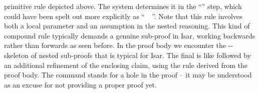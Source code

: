 \begin{isabellebody}
\begin{isamarkuptext}
  primitive rule depicted above.  The system determines it in the
  ``\hyperlink{command.proof}{\mbox{}}'' step, which could have been spelt out more
  explicitly as ``\hyperlink{command.proof}{\mbox{}}~\isa{{\isachardoublequote}{\isacharparenleft}{\isachardoublequote}}\hyperlink{method.rule}{\mbox{}}~\hyperlink{fact.InterI}{\mbox{}}\isa{{\isachardoublequote}{\isacharparenright}{\isachardoublequote}}''.  Note that this rule involves both a local
  parameter  and an assumption  in the
  nested reasoning.  This kind of compound rule typically demands a
  genuine sub-proof in Isar, working backwards rather than forwards as
  seen before.  In the proof body we encounter the \hyperlink{command.fix}{\mbox{}}-\hyperlink{command.assume}{\mbox{}}-\hyperlink{command.show}{\mbox{}} skeleton of nested
  sub-proofs that is typical for Isar.  The final \hyperlink{command.show}{\mbox{}} is
  like \hyperlink{command.have}{\mbox{}} followed by an additional refinement of the
  enclosing claim, using the rule derived from the proof body.  The
  \hyperlink{command.sorry}{\mbox{}} command stands for a hole in the proof -- it may
  be understood as an excuse for not providing a proper proof yet.


\end{isamarkuptext}
\end{isabellebody}
